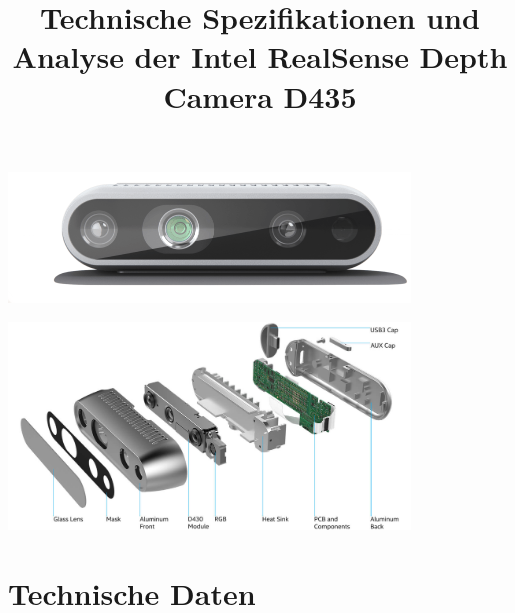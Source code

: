 \documentclass[a4paper,12pt]{article}
\title{Technische Spezifikationen und Analyse der Intel RealSense Depth Camera D435}
\author{}
\date{}
\begin{document}
\maketitle


\begin{center}

\includegraphics[width=0.8\textwidth]{./Bilder/d435-3.png}

\includegraphics[width=0.8\textwidth]{./Bilder/d435_2.jpg}

\end{center}

\section*{Technische Daten}
\end{document}
